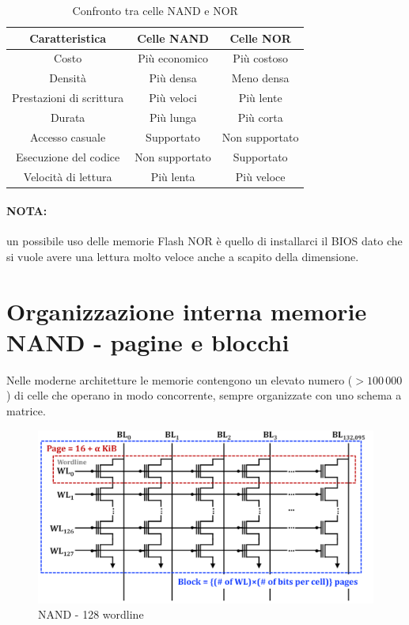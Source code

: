 \newpage

\begin{table}[h!]
\centering
\caption{Confronto tra celle NAND e NOR}
\label{tab:nand_nor}
\begin{tabular}{ c|c|c }

Caratteristica & Celle NAND & Celle NOR \\ \hline
Costo & Più economico & Più costoso \\
Densità & Più densa & Meno densa \\
Prestazioni di scrittura & Più veloci & Più lente \\
Durata & Più lunga & Più corta \\
Accesso casuale & Supportato & Non supportato \\
Esecuzione del codice & Non supportato & Supportato \\
Velocità di lettura & Più lenta & Più veloce \\ 
\end{tabular}
\end{table}

\paragraph{NOTA:} un possibile uso delle memorie Flash NOR è quello di installarci il BIOS dato che si vuole avere una lettura molto veloce anche a scapito della dimensione.


\section{Organizzazione interna memorie NAND - pagine e blocchi}

Nelle moderne architetture le memorie contengono un elevato numero ($>100\,000$) di celle che operano in modo concorrente, sempre organizzate con uno schema a matrice.

\begin{figure}[htbp]
    \centering
    \includegraphics[width=0.65\linewidth]{img/ndg.png}
    \caption{NAND - 128 wordline}
\end{figure}

